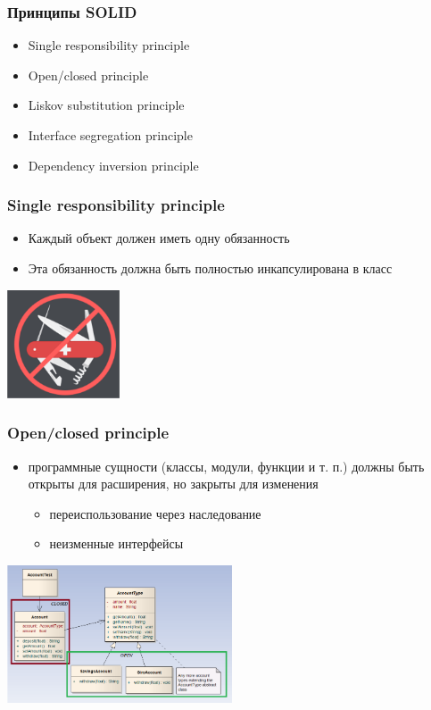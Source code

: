 \documentclass[xetex,mathserif,serif]{beamer}
\begin{document}
	\begin{frame}
		\frametitle{Принципы SOLID}
		\begin{itemize}
			\item Single responsibility principle
			\item Open/closed principle
			\item Liskov substitution principle
			\item Interface segregation principle
			\item Dependency inversion principle
		\end{itemize}
	\end{frame}

	\begin{frame}
		\frametitle{Single responsibility principle}
		\begin{itemize}
			\item Каждый объект должен иметь одну обязанность
			\item Эта обязанность должна быть полностью инкапсулирована в класс
		\end{itemize}
		\begin{flushright}
			\includegraphics[width=0.25\textwidth]{singleResponsibility.png}
		\end{flushright}
	\end{frame}

	\begin{frame}
		\frametitle{Open/closed principle}
		\begin{itemize}
			\item программные сущности (классы, модули, функции и т. п.) должны быть открыты для расширения, но закрыты для изменения
			\begin{itemize}
				\item переиспользование через наследование
				\item неизменные интерфейсы
			\end{itemize}
		\end{itemize}
		\begin{flushright}
			\includegraphics[width=0.5\textwidth]{openClosedPrinciple.png}
		\end{flushright}
	\end{frame}
\end{document}
